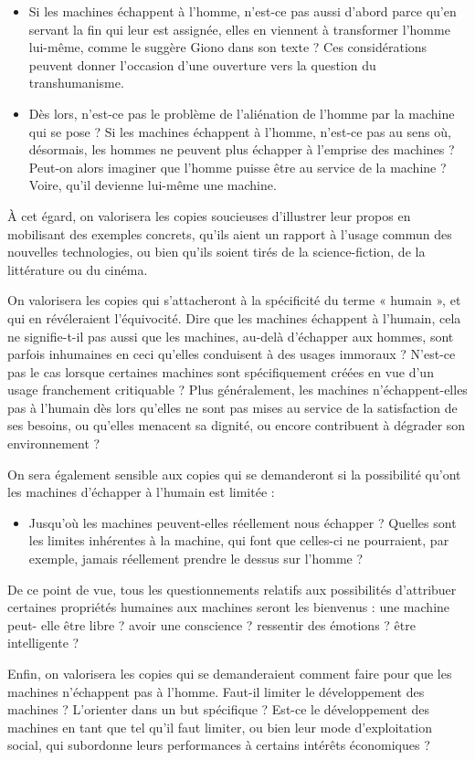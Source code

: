 {\begin{itemize}
\item Si les machines échappent à l'homme, n'est-ce pas aussi d'abord parce
qu'en servant la fin qui leur est assignée, elles en viennent à transformer
l'homme lui-même, comme le suggère Giono dans son texte ? Ces
considérations peuvent donner l'occasion d'une ouverture vers la question
du transhumanisme.
\item Dès lors, n'est-ce pas le problème de l'aliénation de l'homme par la machine
qui se pose ? Si les machines échappent à l'homme, n'est-ce pas au sens
où, désormais, les hommes ne peuvent plus échapper à l'emprise des
machines ? Peut-on alors imaginer que l'homme puisse être au service de
la machine ? Voire, qu'il devienne lui-même une machine.
\end{itemize}
À cet égard, on valorisera les copies soucieuses d'illustrer leur propos en
mobilisant des exemples concrets, qu'ils aient un rapport à l'usage commun des
nouvelles technologies, ou bien qu'ils soient tirés de la science-fiction, de la littérature
ou du cinéma.

On valorisera les copies qui s'attacheront à la spécificité du terme « humain »,
et qui en révéleraient l'équivocité. Dire que les machines échappent à l'humain, cela
ne signifie-t-il pas aussi que les machines, au-delà d'échapper aux hommes, sont
parfois inhumaines en ceci qu'elles conduisent à des usages immoraux ? N'est-ce pas
le cas lorsque certaines machines sont spécifiquement créées en vue d'un usage
franchement critiquable ? Plus généralement, les machines n'échappent-elles pas à
l'humain dès lors qu'elles ne sont pas mises au service de la satisfaction de ses
besoins, ou qu'elles menacent sa dignité, ou encore contribuent à dégrader son
environnement ?

On sera également sensible aux copies qui se demanderont si la possibilité
qu'ont les machines d'échapper à l'humain est limitée :

\begin{itemize}
\item Jusqu'où les machines peuvent-elles réellement nous échapper ? Quelles
sont les limites inhérentes à la machine, qui font que celles-ci ne pourraient,
par exemple, jamais réellement prendre le dessus sur l'homme ?
\end{itemize}

De ce point de vue, tous les questionnements relatifs aux possibilités d'attribuer
certaines propriétés humaines aux machines seront les bienvenus : une machine peut-
elle être libre ? avoir une conscience ? ressentir des émotions ? être intelligente ?

Enfin, on valorisera les copies qui se demanderaient comment faire pour que
les machines n'échappent pas à l'homme. Faut-il limiter le développement des
machines ? L'orienter dans un but spécifique ? Est-ce le développement des machines
en tant que tel qu'il faut limiter, ou bien leur mode d'exploitation social, qui subordonne
leurs performances à certains intérêts économiques ?}%
